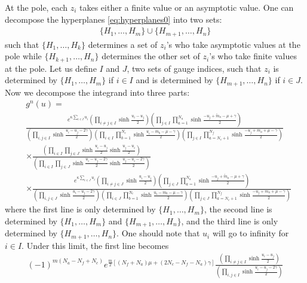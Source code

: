\documentclass[a4paper,11pt]{article}
\begin{document}
At the pole, each $z_i$ takes either a finite value or an asymptotic value. One can decompose the hyperplanes \eqref{eq:hyperplanes0} into two sets:
\begin{align}
\{H_1,\ldots,H_m\} \cup \{H_{m+1},\ldots,H_n\}
\end{align}
such that $\{H_1,\ldots,H_k\}$ determines a set of $z_i$'s who take asymptotic values at the pole while $\{H_{k+1},\ldots,H_n\}$ determines the other set of $z_i$'s who take finite values at the pole. Let us define $I$ and $J$, two sets of gauge indices, such that $z_i$ is determined by $\{H_1,\ldots,H_m\}$ if $i \in I$ and is determined by $\{H_{m+1},\ldots,H_n\}$ if $i \in J$. Now we decompose the integrand into three parts:
\begin{align}
%
& g^n(u) = \nonumber \\
%
& \frac{e^{\kappa \sum_{i \in I} u_i} \left(\prod_{i \neq j \in I} \sinh \frac{u_i-u_j}{2}\right) \left(\prod_{j \in I} \prod_{a = 1}^{N_a} \sinh \frac{-u_j+\tilde m_a-\mu+\gamma}{2}\right)}{\left(\prod_{i,j \in I} \sinh \frac{u_i-u_j-2 \gamma}{2}\right) \left(\prod_{i \in I} \prod_{b = 1}^{N_c} \sinh \frac{u_i-m_b-\mu-\gamma}{2}\right) \left(\prod_{j \in I} \prod_{a = N_c+1}^{N_f} \sinh \frac{-u_j+m_a+\mu-\gamma}{2}\right)} \nonumber \\
%
& \times \frac{\left(\prod_{i \in I} \prod_{j \in J} \sinh \frac{u_i-u_j}{2} \sinh \frac{u_j-u_i}{2}\right)}{\left(\prod_{i \in I} \prod_{j \in J} \sinh \frac{u_i-u_j-2 \gamma}{2} \sinh \frac{u_j-u_i-2 \gamma}{2}\right)} \nonumber \\
%
& \times \frac{e^{\kappa \sum_{i \in J} u_i} \left(\prod_{i \neq j \in J} \sinh \frac{u_i-u_j}{2}\right) \left(\prod_{j \in J} \prod_{a = 1}^{N_a} \sinh \frac{-u_j+\tilde m_a-\mu+\gamma}{2}\right)}{\left(\prod_{i,j \in J} \sinh \frac{u_i-u_j-2 \gamma}{2}\right) \left(\prod_{i \in J} \prod_{b = 1}^{N_c} \sinh \frac{u_i-m_b-\mu-\gamma}{2}\right) \left(\prod_{j \in J} \prod_{a = N_c+1}^{N_f} \sinh \frac{-u_j+m_a+\mu-\gamma}{2}\right)}
%
\end{align}
where the first line is only determined by $\{H_1,\ldots,H_m\}$, the second line is determined by $\{H_1,\ldots,H_m\}$ and $\{H_{m+1},\ldots,H_n\}$, and the third line is only determined by $\{H_{m+1},\ldots,H_n\}$. One should note that $u_i$ will go to infinity for $i \in I$. Under this limit, the first line becomes
\begin{align}
(-1)^{m (N_a-N_f+N_c)} e^{\frac{m}{2} [(N_f+N_a) \mu+(2 N_c-N_f-N_a) \gamma]} \frac{\left(\prod_{i \neq j \in I} \sinh \frac{u_i-u_j}{2}\right)}{\left(\prod_{i,j \in I} \sinh \frac{u_i-u_j-2 \gamma}{2}\right)}
\end{align}
\end{document}
